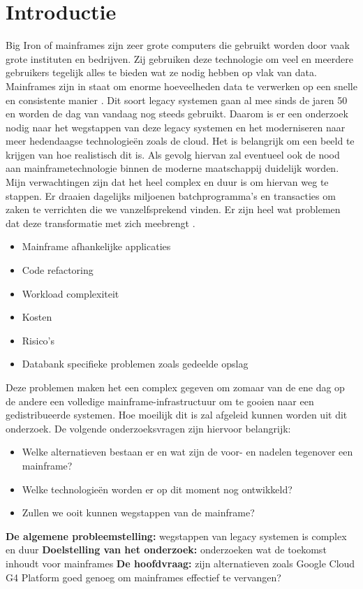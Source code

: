 
\section{Introductie} %
\label{sec:introductie}
Big Iron of mainframes zijn zeer grote computers die gebruikt worden door vaak grote instituten en bedrijven. Zij gebruiken deze technologie om veel en meerdere gebruikers tegelijk alles te bieden wat ze nodig hebben op vlak van data. Mainframes zijn in staat om enorme hoeveelheden data te verwerken op een snelle en consistente manier \autocite{Ebbers2016}. Dit soort legacy systemen gaan al mee sinds de jaren 50 en worden de dag van vandaag nog steeds gebruikt. Daarom is er een onderzoek nodig naar het wegstappen van deze legacy systemen en het moderniseren naar meer hedendaagse technologieën zoals de cloud. Het is belangrijk om een beeld te krijgen van hoe realistisch dit is. Als gevolg hiervan zal eventueel ook de nood aan mainframetechnologie binnen de moderne maatschappij duidelijk worden. Mijn verwachtingen zijn dat het heel complex en duur is om hiervan weg te stappen. Er draaien dagelijks miljoenen batchprogramma’s en transacties om zaken te verrichten die we vanzelfsprekend vinden. Er zijn heel wat problemen dat deze transformatie met zich meebrengt  \autocite{Long2018}.
\begin{itemize}
    \item Mainframe afhankelijke applicaties
    \item Code refactoring
    \item Workload complexiteit
    \item Kosten
    \item Risico's
    \item Databank specifieke problemen zoals gedeelde opslag
\end{itemize}
Deze problemen maken het een complex gegeven om zomaar van de ene dag op de andere een volledige mainframe-infrastructuur om te gooien naar een gedistribueerde systemen. Hoe moeilijk dit is zal afgeleid kunnen worden uit dit onderzoek. De volgende onderzoeksvragen zijn hiervoor belangrijk:
\begin{itemize}
    \item Welke alternatieven bestaan er en wat zijn de voor- en nadelen tegenover een mainframe?
    \item Welke technologieën worden er op dit moment nog ontwikkeld?
    \item Zullen we ooit kunnen wegstappen van de mainframe?
\end{itemize}
\textbf{De algemene probleemstelling:} wegstappen van legacy systemen is complex en duur \newline
\textbf{Doelstelling van het onderzoek:} onderzoeken wat de toekomst inhoudt voor mainframes \newline
\textbf{De hoofdvraag:} zijn alternatieven zoals Google Cloud G4 Platform goed genoeg om mainframes effectief te vervangen?

